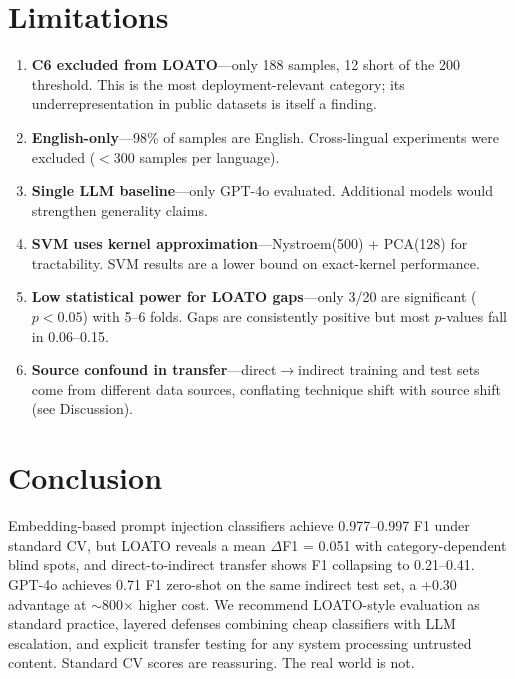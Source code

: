 \documentclass[conference]{IEEEtran}
\newcommand{\df}{$\Delta$F1}
\newcommand{\Fone}{F1}
\begin{document}
\section{Limitations}
\label{sec:limitations}

\begin{enumerate}[nosep,leftmargin=*]
\item \textbf{C6 excluded from LOATO}---only 188 samples, 12 short of the 200
  threshold. This is the most deployment-relevant category; its
  underrepresentation in public datasets is itself a finding.
\item \textbf{English-only}---98\% of samples are English. Cross-lingual
  experiments were excluded ($<$300 samples per language).
\item \textbf{Single LLM baseline}---only GPT-4o evaluated. Additional models
  would strengthen generality claims.
\item \textbf{SVM uses kernel approximation}---Nystroem(500) + PCA(128) for
  tractability. SVM results are a lower bound on exact-kernel performance.
\item \textbf{Low statistical power for LOATO gaps}---only 3/20 are significant
  ($p < 0.05$) with 5--6 folds. Gaps are consistently positive but most
  $p$-values fall in 0.06--0.15.
\item \textbf{Source confound in transfer}---direct$\to$indirect training and
  test sets come from different data sources, conflating technique shift with
  source shift (see Discussion).
\end{enumerate}

\section{Conclusion}
\label{sec:conclusion}

Embedding-based prompt injection classifiers achieve 0.977--0.997 \Fone{} under
standard CV, but LOATO reveals a mean \df{} = 0.051 with category-dependent
blind spots, and direct-to-indirect transfer shows \Fone{} collapsing to
0.21--0.41. GPT-4o achieves 0.71 \Fone{} zero-shot on the same indirect test
set, a +0.30 advantage at $\sim$800$\times$ higher cost. We recommend
LOATO-style evaluation as standard practice, layered defenses combining cheap
classifiers with LLM escalation, and explicit transfer testing for any system
processing untrusted content. Standard CV scores are reassuring. The real world
is not.
\end{document}
